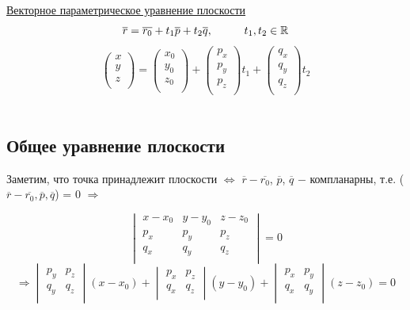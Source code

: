 \underline{Векторное параметрическое уравнение плоскости}
\[
\overline{r} = \overline{r_0} + t_1\overline{p} + t_2\overline{q},\hspace*{1cm} t_1, t_2\in\mathbb{R}
\]
\[
\begin{pmatrix}
    x\\
    y\\
    z\\
\end{pmatrix} = 
\begin{pmatrix}
    x_0\\
    y_0\\
    z_0\\
\end{pmatrix} + 
\begin{pmatrix}
    p_x\\
    p_y\\
    p_z\\
\end{pmatrix}t_1 + 
\begin{pmatrix}
    q_x\\
    q_y\\
    q_z\\
\end{pmatrix}t_2
\]
\tab\\

\subsection{Общее уравнение плоскости}

Заметим, что точка принадлежит плоскости $\Longleftrightarrow$ $\overline{r} - \overline{r_0}$, $\overline{p}$, $\overline{q}$ $-$ компланарны, т.е. ($\overline{r} - \overline{r_0}, \overline{p}, \overline{q}$) = 0 $\Longrightarrow$

\[
\begin{vmatrix}
    x - x_0 & y - y_0 & z - z_0\\
    p_x & p_y & p_z\\
    q_x & q_y & q_z\\
\end{vmatrix} = 0
\]
\[
\Longrightarrow 
\begin{vmatrix}
    p_y & p_z\\
    q_y & q_z\\
\end{vmatrix}(x - x_0) + 
\begin{vmatrix}
    p_x & p_z\\
    q_x & q_z\\
\end{vmatrix}(y - y_0) +
\begin{vmatrix}
    p_x & p_y\\
    q_x & q_y\\
\end{vmatrix}(z - z_0) = 0
\]

